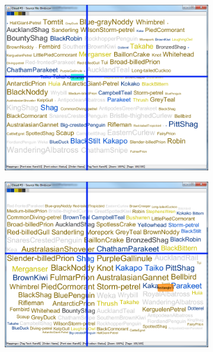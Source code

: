 \begin{figure}[!htb]
\begin{subfigure}{.5\textwidth}
  \includegraphics[scale=0.25]{Experiment1/Trial2/C2S1L2.png}
\end{subfigure}%
\begin{subfigure}{.5\textwidth}
  \centering
 \includegraphics[scale=0.25]{Experiment1/Trial2/C2S1L1.png}
\end{subfigure}
\begin{subfigure}{.5\textwidth}
  \centering

\end{subfigure}
\end{figure}
